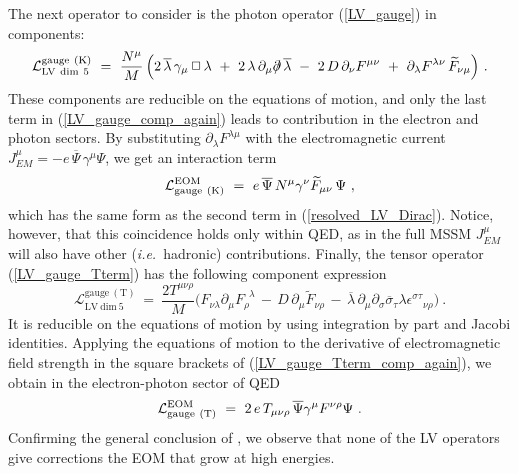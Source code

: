 \documentclass[12pt]{revtex4}
\newcommand{\slashed}[1]{\hbox{{$#1$}\llap{$/$}}}
\begin{document}
%
The next operator to consider is the photon operator
(\ref{LV_gauge}) in components:
\begin{equation}
\label{LV_gauge_comp_again}
\mathcal{L}_{\mathrm{LV~dim~5}}^{\mathrm{gauge\ (K)}} 
 ~=~ \frac{N^\mu}{M}\,  
\Big( 
2\, \overline{\lambda}\,\gamma_\mu\, \Box\, 
   \lambda 
~+~
2\, \lambda\, \partial_\mu \slashed{\partial}\, 
   \overline{\lambda} 
~-~ 
2\, D\, \partial_\nu F^{\mu\nu}
~+~ 
\partial_\lambda F^{\lambda\nu}\, 
\widetilde{F}_{\nu\mu} 
\Big)~.
\end{equation}
%
These components are reducible on the equations of motion, 
and only the last term in (\ref{LV_gauge_comp_again})
leads to contribution in the electron and photon sectors. 
By substituting $ \partial_\lambda F^{\lambda\mu} $ 
with the electromagnetic current 
$ J_{EM}^\mu=- e\, \overline{\Psi}\, \gamma^\mu \Psi $,
we get an interaction term
\begin{equation}
\label{LV_induced_by_gauge_K}
        \mathcal{L}_{\rm gauge\ (K)}^{\rm EOM} ~=~  
 e\, \overline{\Psi}\, N^\mu \gamma^\nu
\widetilde{F}_{\mu\nu}\, \Psi~,
\end{equation}
%
which  has the same form as the second term in (\ref{resolved_LV_Dirac}).
Notice, however, that this coincidence holds only within QED, 
as in the full MSSM $J_{EM}^\mu$ will also have other 
({\em i.e.}\ hadronic) contributions. Finally, the tensor operator
(\ref{LV_gauge_Tterm}) has the following component expression 
\begin{equation}
\mathcal{L}_{\mathrm{LV~dim~5}}^{\mathrm{gauge\ (T)}}  
      ~  =~ 
\frac{2T^{\mu\nu\rho}}{M}
\Big( 
F_{\nu\lambda}\partial_\mu F_\rho^{\phantom{\rho}\lambda}
\,-\, D\, \partial_\mu \widetilde{F}_{\nu\rho} 
\,-\,\overline{\lambda}\, \partial_\mu \partial_\sigma
\overline{\sigma}_\tau \lambda \epsilon^{\sigma\tau}{}_{\nu\rho}
\Big)~.
\label{LV_gauge_Tterm_comp_again}
\end{equation}
It is reducible on the equations of motion by using integration by
part and Jacobi identities.     
Applying the equations of motion to the derivative of
electromagnetic field strength in the square brackets of 
(\ref{LV_gauge_Tterm_comp_again}), we obtain in the
electron-photon sector of QED
\begin{eqnarray}
        \mathcal{L}_{\rm gauge\ (T)}^{\rm EOM} ~=~   
\label{LV_induced_by_gauge_T}
        2\,e\,  T_{\mu\nu\rho} \, 
         \overline{\Psi} \gamma^\mu F^{\nu\rho} \Psi
        ~.
\end{eqnarray}
%
Confirming the general conclusion of \cite{GrootNibbelink:2004za}, we
observe that none of the LV operators give corrections the EOM that
grow at high energies.  
\end{document}
